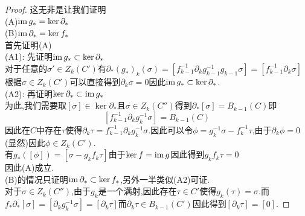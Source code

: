 \documentclass{article}
\begin{document}
\begin{proof}
    这无非是让我们证明\\
    (A)$\operatorname{im} g_* = \ker \partial_*$\\
    (B)$\operatorname{im} \partial_* = \ker f_*$\\
    首先证明(A)\\
    (A1): 先证明$\operatorname{im} g_* \subset \ker \partial_*$\\
    对于任意的$\sigma' \in Z_k(C')$有$\partial_*(g_*)_k(\sigma) = [f_{k-1}^{-1}\partial_k g^{-1}_{k-1}g_{k-1}\sigma] = [f_{k-1}^{-1}\partial_k \sigma]$
    根据$\sigma \in Z_k(C')$可以直接得到$\partial_k \sigma = 0$因此$\operatorname{im} g_* \subset \ker \partial_*$.\\
    (A2): 再证明$\ker \partial_* \subset \operatorname{im} g_*$\\
    为此,我们需要取$[\sigma] \in \ker \partial_*$且$\sigma \in Z_k(C'')$得到$\partial_* [\sigma] = B_{k-1}(C)$即
    $$
    [f^{-1}_{k-1}\partial_kg_{k}^{-1}\sigma] = B_{k-1}(C)
    $$
    因此在$C$中存在$\tau$使得$\partial_k \tau = f^{-1}_{k-1}\partial_k g_k^{-1}\sigma$.因此可以令$\phi = g_k^{-1}\sigma - f_k^{-1}\tau$,由于$\partial_k \phi = 0$(显然)因此$\phi \in Z_k(C')$.\\
    有$g_*([\phi]) = [\sigma - g_kf_k\tau]$由于$\ker f = \operatorname{im} g$因此得到$g_k f_k \tau  =0 $\\
    因此(A)成立.\\
    (B)的情况只证明$\operatorname{im} \partial_* \subset \ker f_*$,另外一半类似(A2)可证.\\
    对于$\sigma \in Z_k(C'')$,由于$g_k$是一个满射,因此存在$\tau \in C'$使得$g_k(\tau) = \sigma$.而$f_*\partial_* [\sigma] = [\partial_k g_k^{-1}\sigma] = [\partial_k \tau]$而$\partial_k \tau \in B_{k-1}(C')$因此得到$[\partial_k \tau] = [0]$.
\end{proof}
\end{document}
